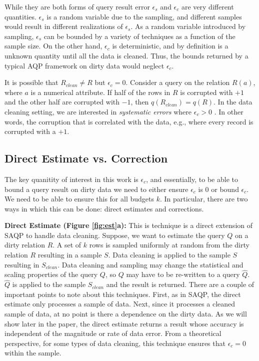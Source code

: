 While they are both forms of query result error $\epsilon_s$ and $\epsilon_c$ are very different quantities.
$\epsilon_s$ is a random variable due to the sampling, and different samples would result in different realizations of $\epsilon_s$.
As a random variable introduced by sampling, $\epsilon_s$ can be bounded by a variety of techniques as a function of the sample size.
On the other hand, $\epsilon_c$ is deterministic, and by definition is a unknown quantity until all the data is cleaned.
Thus, the bounds returned by a typical AQP framework on dirty data would neglect $\epsilon_c$.

It is possible that $R_{clean} \ne R$ but $\epsilon_c=0$.
Consider a \sumfunc query on the relation $R(a)$, where $a$ is a numerical attribute.
If half of the rows in $R$ is corrupted with $+1$ and the other half are corrupted with $-1$, then $q(R_{clean}) = q(R)$.
In the data cleaning setting, we are interested in \emph{systematic errors} where $\epsilon_c > 0$ \cite{taylor1982introduction}. 
In other words, the corruption that is correlated with the data, e.g., where every record is corrupted with a $+1$.

\subsection{Direct Estimate vs. Correction}
The key quanitity of interest in this work is $\epsilon_c$, and essentially, to be able to bound
a query result on dirty data we need to either ensure $\epsilon_c$ is 0 or bound $\epsilon_c$.
We need to be able to ensure this for all budgets $k$.
In particular, there are two ways in which this can be done: direct estimates and corrections.

\vspace{0.5em}
\noindent\textbf{Direct Estimate (Figure \ref{fig:est}a): } This is technique is a direct extension of SAQP to handle data cleaning. Suppose, we want to estimate the query $Q$ on a dirty relation $R$. A set of $k$ rows is sampled uniformly at random from the dirty relation $R$ resulting in a sample $S$. Data cleaning is applied to the sample $S$ resulting in $S_{clean}$.
Data cleaning and sampling may change the statistical and scaling properties of the query $Q$, so $Q$ may have to be re-written to a query $\widehat{Q}$. $\widehat{Q}$ is applied to the sample $S_{clean}$ and the result is returned. 
There are a couple of important points to note about this techniques.
First, as in SAQP, the direct estimate only processes a sample of data.
Next, since it processes a cleaned sample of data, at no point is there a dependence on the dirty data.
As we will show later in the paper, the direct estimate returns a result whose accuracy is independent of the magnitude or rate of data error. 
From a theoretical perspective, for some types of data cleaning, this technique ensures that $\epsilon_c = 0$ within the sample.

